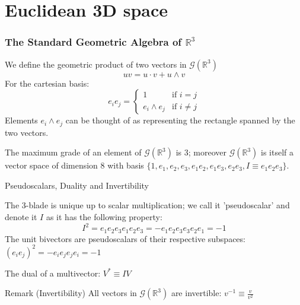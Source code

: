 \documentclass{beamer}
\newcommand{\R}{\mathbb{R}}
\newcommand{\G}{\mathcal{G}}
\begin{document}
\section{Euclidean 3D space}
\setlength{\belowdisplayskip}{0pt}
\setlength{\abovedisplayskip}{0pt}
\begin{frame}
\frametitle{The Standard Geometric Algebra of $\R^3$}
We define the geometric product of two vectors in $\G(\R^3)$
\[ uv = u \cdot v + u\wedge v\]
For the cartesian basis:
\[
    e_ie_j = \begin{cases}
        1 &\text{if\ } i=j\\
        e_i\wedge e_j &\text{if\ } i \neq j
    \end{cases}
\]
Elements $e_i\wedge e_j$ can be thought of as representing the rectangle spanned by the two vectors.
\begin{theorem}
    The maximum grade of an element of $\G(\R^3)$ is 3; moreover $\G(\R^3)$ is itself a vector space of dimension 8 with basis $\{1, e_1, e_2, e_3, e_1e_2, e_1e_3, e_2e_3, I\equiv e_1e_2e_3\}$.
\end{theorem}
\end{frame}
\setlength{\belowdisplayskip}{\baselineskip}
\setlength{\abovedisplayskip}{\baselineskip}

\begin{frame}{Pseudoscalars, Duality and Invertibility}
    \begin{definition}[Pseudoscalar]
\setlength{\belowdisplayskip}{0.5\baselineskip}
\setlength{\abovedisplayskip}{0.5\baselineskip}
    The 3-blade is unique up to scalar multiplication; we call it 'pseudoscalar' and denote it $I$ as it has the following property: \[I^2=e_1e_2e_3e_1e_2e_3=-e_1e_2e_3e_3e_2e_1=-1\]
    The unit bivectors are pseudoscalars of their respective subspaces: $(e_ie_j)^2 = -e_ie_je_je_i = -1$
\setlength{\belowdisplayskip}{\baselineskip}
\setlength{\abovedisplayskip}{\baselineskip}    
    \end{definition}
  
    \begin{definition}[Dual]
    The dual of a multivector: $V^* \equiv IV$
    \end{definition}
  
    \begin{block}{Remark (Invertibility)}
        All vectors in $\G(\R^3)$ are invertible: $v^{-1} \equiv \frac{v}{v^2}$
    \end{block}
  
\end{frame}
\end{document}
